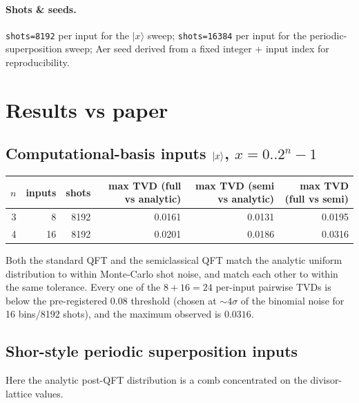 \documentclass[11pt,letterpaper]{article}
\begin{document}
\paragraph{Shots \& seeds.}
\texttt{shots=8192} per input for the $|x\rangle$ sweep;
\texttt{shots=16384} per input for the periodic-superposition sweep;
Aer seed derived from a fixed integer + input index for reproducibility.

\section{Results vs paper}

\subsection{Computational-basis inputs $\ket{x}$, $x=0..2^n-1$}

\begin{center}
\begin{tabular}{@{}rrrrrr@{}}
\toprule
$n$ & inputs & shots & max TVD (full vs analytic) & max TVD (semi vs analytic) & max TVD (full vs semi) \\
\midrule
3 & 8  & 8192 & 0.0161 & 0.0131 & 0.0195 \\
4 & 16 & 8192 & 0.0201 & 0.0186 & 0.0316 \\
\bottomrule
\end{tabular}
\end{center}

Both the standard QFT and the semiclassical QFT match the analytic
uniform distribution to within Monte-Carlo shot noise, and match each
other to within the same tolerance. Every one of the $8+16=24$
per-input pairwise TVDs is below the pre-registered $0.08$ threshold
(chosen at $\sim 4\sigma$ of the binomial noise for 16 bins/8192
shots), and the maximum observed is $0.0316$.

\subsection{Shor-style periodic superposition inputs}

Here the analytic post-QFT distribution is a comb concentrated on the
divisor-lattice values.
\end{document}
